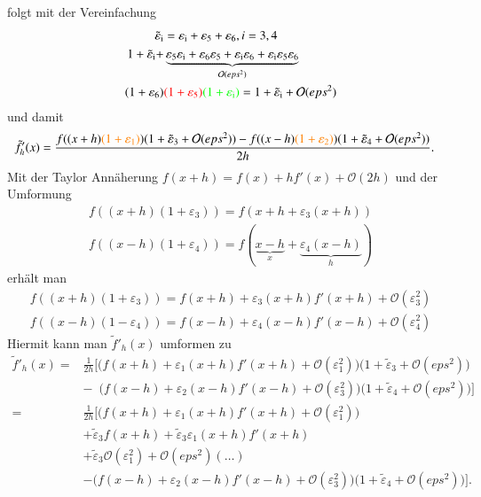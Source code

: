 \documentclass[10pt,a4paper]{article}
\begin{document}
	folgt mit der Vereinfachung
	\begin{align*}
		\tilde{\varepsilon}_\text{i}&=\varepsilon_\text{i}+\varepsilon_5+\varepsilon_6, i=3,4\\
		1 + \tilde{\varepsilon}_\text{i} + &\underbrace{\varepsilon_5 \varepsilon_\text{i}  + \varepsilon_6 \varepsilon_5 + \varepsilon_\text{i} \varepsilon_6 + \varepsilon_\text{i} \varepsilon_5 \varepsilon_6}_{\mathcal{O}(eps^2)} \\
		(1+\varepsilon_6)&{\color{red}(1+\varepsilon_5)}{\color{green}(1+\varepsilon_\text{i})} = 1 + \tilde{\varepsilon}_\text{i} + \mathcal{O}(eps^2)
	\end{align*}
	und damit
	\begin{align*}
		\tilde{f}'_h(x) &=\frac{f((x+h){\color{orange}(1+\varepsilon_1)})( 1 + \tilde{\varepsilon}_3 + \mathcal{O}(eps^2))-f((x-h){\color{orange}(1+\varepsilon_2)})( 1 + \tilde{\varepsilon}_4 + \mathcal{O}(eps^2))}{2h}.
	\end{align*}
	Mit der Taylor Annäherung $ f(x+h) = f(x)+hf'(x)+\mathcal{O}(2h) $ und der Umformung
	\begin{align*}
		f((x+h)(1+\varepsilon_3)) = f(x+h+\varepsilon_3(x+h)) \\
		f((x-h)(1+\varepsilon_4)) = f(\underbrace{x-h}_x+\underbrace{\varepsilon_4(x-h)}_h)
	\end{align*}
	erhält man
	\begin{align*}
		f((x+h)(1+\varepsilon_3)) = f(x+h) + \varepsilon_3(x+h) f'(x+h) + \mathcal{O}(\varepsilon_3^2) \\
		f((x-h)(1-\varepsilon_4)) = f(x-h) + \varepsilon_4(x-h) f'(x-h) + \mathcal{O}(\varepsilon_4^2)
	\end{align*}
	Hiermit kann man $\tilde{f}'_h(x)$ umformen zu
	\begin{align*}
		\tilde{f}'_h(x) =& \frac{1}{2h}\biggl[ \bigl( f(x+h)+\varepsilon_1 (x+h) f'(x+h) + \mathcal{O}(\varepsilon_1^2) \bigr) \bigl( 1 + \tilde{\varepsilon}_3 + \mathcal{O}(eps^2)  \bigr) \\		
		&-\;\:\bigl( f(x-h)+\varepsilon_2 (x-h) f'(x-h) + \mathcal{O}(\varepsilon_3^2) \bigr) \bigl( 1 + \tilde{\varepsilon}_4 + \mathcal{O}(eps^2)  \bigr)
		\biggr] \\
		=& \frac{1}{2h}\biggl[\bigl(f(x+h)+\varepsilon_1 (x+h) f'(x+h) + \mathcal{O}(\varepsilon_1^2)\bigr)\\
		&+\tilde{\varepsilon}_3 f(x+h)+\tilde{\varepsilon}_3\varepsilon_1 (x+h) f'(x+h) \\
		&+\tilde{\varepsilon}_3\mathcal{O}(\varepsilon_1^2) + \mathcal{O}(eps^2)(\dots)\\
		&-\bigl( f(x-h)+\varepsilon_2 (x-h) f'(x-h) + \mathcal{O}(\varepsilon_3^2)\bigr)\bigl( 1 + \tilde{\varepsilon}_4 + \mathcal{O}(eps^2)\bigr) \biggr].
	\end{align*}
\end{document}
